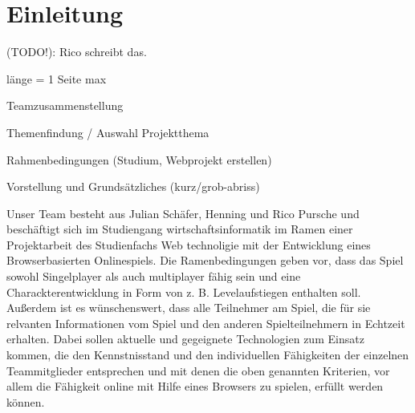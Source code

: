 

\section{Einleitung}

(TODO!): Rico schreibt das.

länge = 1 Seite max

Teamzusammenstellung 

Themenfindung / Auswahl Projektthema

Rahmenbedingungen (Studium, Webprojekt erstellen)

Vorstellung und Grundsätzliches (kurz/grob-abriss)

Unser Team besteht aus Julian Schäfer, Henning und Rico Pursche und beschäftigt sich im Studiengang wirtschaftsinformatik 
im Ramen einer Projektarbeit des Studienfachs Web technoligie mit der Entwicklung eines Browserbasierten Onlinespiels. 
Die Ramenbedingungen geben vor, dass das Spiel sowohl Singelplayer als auch multiplayer fähig sein und eine Charackterentwicklung in 
Form von z. B. Levelaufstiegen enthalten soll. Außerdem ist es wünschenswert, dass alle Teilnehmer am Spiel, die für sie relvanten
Informationen vom Spiel und den anderen Spielteilnehmern in Echtzeit erhalten. Dabei sollen aktuelle und gegeignete Technologien zum 
Einsatz kommen, die den Kennstnisstand und den individuellen Fähigkeiten der einzelnen Teammitglieder entsprechen und mit denen
die oben genannten Kriterien, vor allem die Fähigkeit online mit Hilfe eines Browsers zu spielen, erfüllt werden können. 